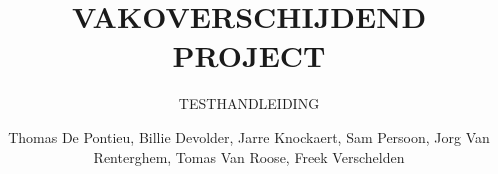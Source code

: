 \documentclass[a4paper, twoside, 12pt]{ugent_report}
\begin{document}
\title{VAKOVERSCHIJDEND PROJECT}
\subtitle{TESTHANDLEIDING\\}
\author{Thomas De Pontieu, Billie Devolder, Jarre Knockaert, Sam Persoon, Jorg Van Renterghem, Tomas Van Roose, Freek Verschelden}
\maketitle

\restoregeometry
\newpage\null\thispagestyle{empty}\newpage
\end{document}
